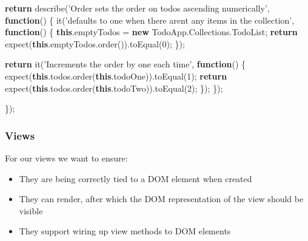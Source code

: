 \documentclass[9pt]{book}
\newenvironment{Shaded}{}{}
\newcommand{\KeywordTok}[1]{\textcolor[rgb]{0.00,0.44,0.13}{\textbf{{#1}}}}
\newcommand{\DecValTok}[1]{\textcolor[rgb]{0.25,0.63,0.44}{{#1}}}
\newcommand{\StringTok}[1]{\textcolor[rgb]{0.25,0.44,0.63}{{#1}}}
\newcommand{\OtherTok}[1]{\textcolor[rgb]{0.00,0.44,0.13}{{#1}}}
\newcommand{\FunctionTok}[1]{\textcolor[rgb]{0.02,0.16,0.49}{{#1}}}
\newcommand{\NormalTok}[1]{{#1}}
\begin{document}
\begin{Shaded}
\begin{Highlighting}[]
    \KeywordTok{return} \FunctionTok{describe}\NormalTok{(}\StringTok{'Order sets the order on todos ascending numerically'}\NormalTok{, }\KeywordTok{function}\NormalTok{() \{}
      \FunctionTok{it}\NormalTok{(}\StringTok{'defaults to one when there arent any items in the collection'}\NormalTok{, }\KeywordTok{function}\NormalTok{() \{}
        \KeywordTok{this}\NormalTok{.}\FunctionTok{emptyTodos} \NormalTok{= }\KeywordTok{new} \OtherTok{TodoApp}\NormalTok{.}\OtherTok{Collections}\NormalTok{.}\FunctionTok{TodoList}\NormalTok{;}
        \KeywordTok{return} \FunctionTok{expect}\NormalTok{(}\KeywordTok{this}\NormalTok{.}\OtherTok{emptyTodos}\NormalTok{.}\FunctionTok{order}\NormalTok{()).}\FunctionTok{toEqual}\NormalTok{(}\DecValTok{0}\NormalTok{);}
      \NormalTok{\});}

      \KeywordTok{return} \FunctionTok{it}\NormalTok{(}\StringTok{'Increments the order by one each time'}\NormalTok{, }\KeywordTok{function}\NormalTok{() \{}
        \FunctionTok{expect}\NormalTok{(}\KeywordTok{this}\NormalTok{.}\OtherTok{todos}\NormalTok{.}\FunctionTok{order}\NormalTok{(}\KeywordTok{this}\NormalTok{.}\FunctionTok{todoOne}\NormalTok{)).}\FunctionTok{toEqual}\NormalTok{(}\DecValTok{1}\NormalTok{);}
        \KeywordTok{return} \FunctionTok{expect}\NormalTok{(}\KeywordTok{this}\NormalTok{.}\OtherTok{todos}\NormalTok{.}\FunctionTok{order}\NormalTok{(}\KeywordTok{this}\NormalTok{.}\FunctionTok{todoTwo}\NormalTok{)).}\FunctionTok{toEqual}\NormalTok{(}\DecValTok{2}\NormalTok{);}
      \NormalTok{\});}
    \NormalTok{\});}

  \NormalTok{\});}
\end{Highlighting}
\end{Shaded}

\subsubsection{Views}\label{views-3}

For our views we want to ensure:

\begin{itemize}
\itemsep1pt\parskip0pt
\item
  They are being correctly tied to a DOM element when created
\item
  They can render, after which the DOM representation of the view should
  be visible
\item
  They support wiring up view methods to DOM elements
\end{itemize}
\end{document}
